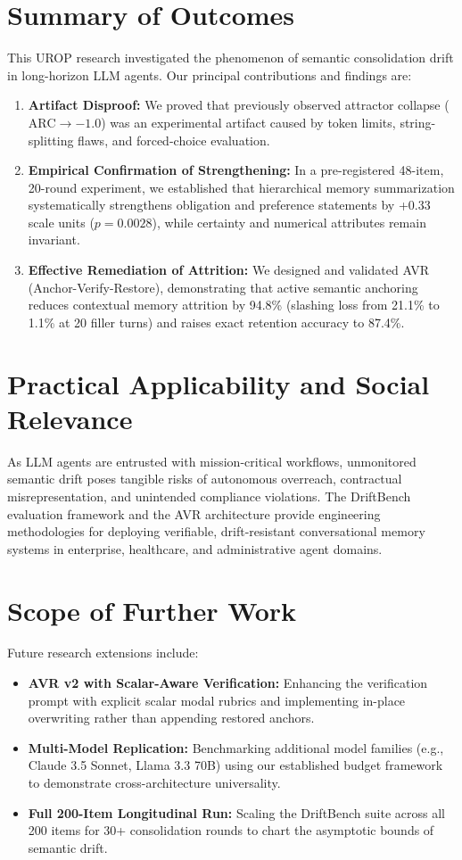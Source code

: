\documentclass[12pt,a4paper]{report}
\begin{document}
\section{Summary of Outcomes}
This UROP research investigated the phenomenon of semantic consolidation drift in long-horizon LLM agents. Our principal contributions and findings are:
\begin{enumerate}
    \item \textbf{Artifact Disproof:} We proved that previously observed attractor collapse ($\text{ARC} \to -1.0$) was an experimental artifact caused by token limits, string-splitting flaws, and forced-choice evaluation.
    \item \textbf{Empirical Confirmation of Strengthening:} In a pre-registered 48-item, 20-round experiment, we established that hierarchical memory summarization systematically strengthens obligation and preference statements by +0.33 scale units ($p=0.0028$), while certainty and numerical attributes remain invariant.
    \item \textbf{Effective Remediation of Attrition:} We designed and validated AVR (Anchor-Verify-Restore), demonstrating that active semantic anchoring reduces contextual memory attrition by 94.8\% (slashing loss from 21.1\% to 1.1\% at 20 filler turns) and raises exact retention accuracy to 87.4\%.
\end{enumerate}

\section{Practical Applicability and Social Relevance}
As LLM agents are entrusted with mission-critical workflows, unmonitored semantic drift poses tangible risks of autonomous overreach, contractual misrepresentation, and unintended compliance violations. The DriftBench evaluation framework and the AVR architecture provide engineering methodologies for deploying verifiable, drift-resistant conversational memory systems in enterprise, healthcare, and administrative agent domains.

\section{Scope of Further Work}
Future research extensions include:
\begin{itemize}
    \item \textbf{AVR v2 with Scalar-Aware Verification:} Enhancing the verification prompt with explicit scalar modal rubrics and implementing in-place overwriting rather than appending restored anchors.
    \item \textbf{Multi-Model Replication:} Benchmarking additional model families (e.g., Claude 3.5 Sonnet, Llama 3.3 70B) using our established budget framework to demonstrate cross-architecture universality.
    \item \textbf{Full 200-Item Longitudinal Run:} Scaling the DriftBench suite across all 200 items for 30+ consolidation rounds to chart the asymptotic bounds of semantic drift.
\end{itemize}
\end{document}
